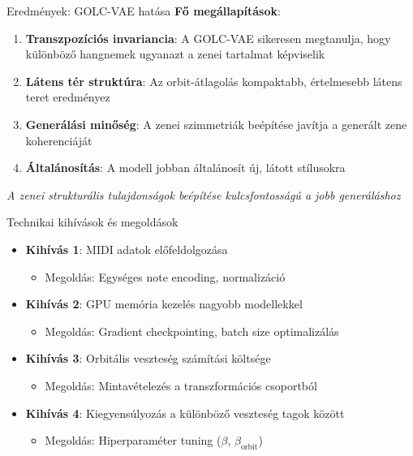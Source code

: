 \documentclass[aspectratio=169]{beamer}
\begin{document}
\begin{frame}{Eredmények: GOLC-VAE hatása}
\textbf{Fő megállapítások}:

\begin{enumerate}
    \item \textbf{Transzpozíciós invariancia}: A GOLC-VAE sikeresen megtanulja, hogy különböző hangnemek ugyanazt a zenei tartalmat képviselik
    
    \item \textbf{Látens tér struktúra}: Az orbit-átlagolás kompaktabb, értelmesebb látens teret eredményez
    
    \item \textbf{Generálási minőség}: A zenei szimmetriák beépítése javítja a generált zene koherenciáját
    
    \item \textbf{Általánosítás}: A modell jobban általánosít új, látott stílusokra
\end{enumerate}

\vspace{0.5em}
\begin{center}
\textit{A zenei strukturális tulajdonságok beépítése kulcsfontosságú a jobb generáláshoz}
\end{center}
\end{frame}

\begin{frame}{Technikai kihívások és megoldások}
\begin{itemize}
    \item \textbf{Kihívás 1}: MIDI adatok előfeldolgozása
    \begin{itemize}
        \item Megoldás: Egységes note encoding, normalizáció
    \end{itemize}
    
    \item \textbf{Kihívás 2}: GPU memória kezelés nagyobb modellekkel
    \begin{itemize}
        \item Megoldás: Gradient checkpointing, batch size optimalizálás
    \end{itemize}
    
    \item \textbf{Kihívás 3}: Orbitális veszteség számítási költsége
    \begin{itemize}
        \item Megoldás: Mintavételezés a transzformációs csoportból
    \end{itemize}
    
    \item \textbf{Kihívás 4}: Kiegyensúlyozás a különböző veszteség tagok között
    \begin{itemize}
        \item Megoldás: Hiperparaméter tuning ($\beta$, $\beta_{\text{orbit}}$)
    \end{itemize}
\end{itemize}
\end{frame}
\end{document}
